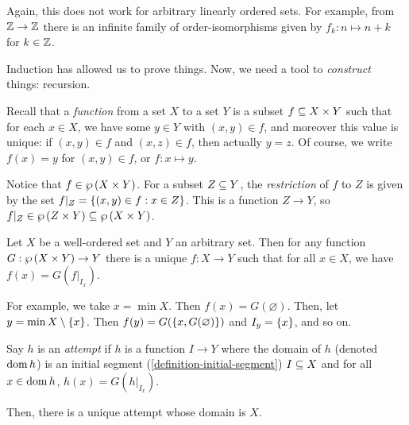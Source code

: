 \documentclass{article}
\begin{document}
\begin{note}
	Again, this does not work for arbitrary linearly ordered sets. For example, from $\mathbb{Z} \to \mathbb{Z}$ there is an infinite family of order-isomorphisms given by $f_k : n \mapsto n + k$ for $k \in \mathbb{Z}$.
\end{note}

Induction has allowed us to prove things. Now, we need a tool to \textit{construct} things: recursion.

\begin{remark}
    Recall that a \textit{function} from a set $X$ to a set $Y$ is a subset $f \subseteq X \times Y$ such that for each $x \in X$, we have some $y \in Y$ with $(x, y) \in f$, and moreover this value is unique: if $(x, y) \in f$ and $(x, z) \in f$, then actually $y = z$. Of course, we write $f(x) = y$ for $(x, y) \in f$, or $f: x \mapsto y$.

	Notice that $f \in \wp\left(X \times Y\right)$. For a subset $Z \subseteq Y$, the \textit{restriction} of $f$ to $Z$ is given by the set $f|_Z = \left\lbrace (x, y) \in f: x \in Z \right\rbrace$. This is a function $Z \to Y$, so $f|_Z \in \wp\left(Z \times Y\right) \subseteq \wp\left(X \times Y\right)$.
\end{remark}

\begin{theorem}
	\label{definition-by-recursion}
    Let $X$ be a well-ordered set and $Y$ an arbitrary set. Then for any function $G: \wp\left(X \times Y\right) \to Y$ there is a unique $f: X \to Y$ such that for all $x \in X$, we have $f(x) = G(f|_{I_x})$.
    
    For example, we take $x = \min X$. Then $f(x) = G(\varnothing)$. Then, let $y = \min X \setminus \left\lbrace x \right\rbrace$. Then $f(y) = G(\left\lbrace x, G(\varnothing) \right\rbrace)$ and $I_y = \left\lbrace x \right\rbrace$, and so on.
    
    Say $h$ is an \textit{attempt} if $h$ is a function $I \to Y$ where the domain of $h$ (denoted $\operatorname{dom} h$) is an initial segment (\ref{definition-initial-segment}) $I \subseteq X$ and for all $x \in \operatorname{dom} h$, $h(x) = G(h|_{I_x})$.
    
    Then, there is a unique attempt whose domain is $X$.
\end{theorem}
\end{document}
